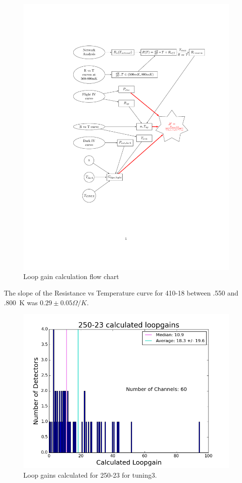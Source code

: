 \begin{figure}[htbp]
\begin{center}
\includegraphics[width=1.0 \textwidth]{figures/loopgain_flowchart.pdf}
\caption{Loop gain calculation flow chart}
\label{fig:loopgain_flow}
\end{center}
\end{figure}

The slope of the Resistance vs Temperature curve for 410-18 between .550 and .800~K was $0.29\pm0.05 \Omega/K$. 

\begin{figure}[htbp]
\begin{center}
\includegraphics[width=0.5 \textwidth]{figures/250-23_loopgains_calculated_tuning3.png}
\caption{Loop gains calculated for 250-23 for tuning3.}
\label{fig:loopgain_calc_hist}
\end{center}
\end{figure}

